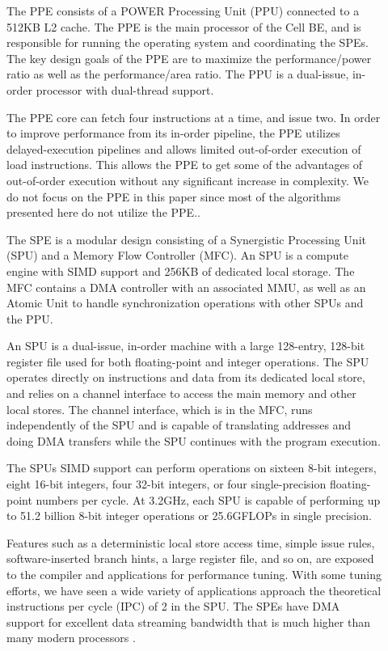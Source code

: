 \documentclass[DIV10, abstracton, openright, footsepline, headsepline, twoside, 9pt,
bigheadings]{scrreprt}
\begin{document}
\begin{description}
\item[\color{Bigblue}{PowerPC Processor Element (PPE)}]
The PPE consists of a POWER Processing Unit (PPU) connected to a 512KB L2 cache.
The PPE is the main processor of the Cell BE, and is responsible for running the
operating system and coordinating the SPEs. The key design goals of the PPE are
to maximize the performance/power ratio as well as the performance/area ratio.
The PPU is a dual-issue, in-order processor with dual-thread
support.

The PPE core can fetch four instructions at a time, and issue two. In order to
improve performance from its in-order pipeline, the PPE utilizes
delayed-execution pipelines and allows limited out-of-order execution of load
instructions. This allows the PPE to get some of the advantages of out-of-order
execution without any significant increase in complexity. We do not focus on the
PPE in this paper since most of the algorithms presented here do not utilize the
PPE.\cite{IBMhp05}.



\item[\color{Bigblue}{Synergistic Processor Elements (SPEs)}]
 The SPE is a modular design consisting of a Synergistic Processing Unit (SPU)
and a Memory Flow Controller (MFC). An SPU is a compute engine with SIMD support
and 256KB of dedicated local storage. The MFC contains a DMA controller with an
associated MMU, as well as an Atomic Unit to handle synchronization operations
with other SPUs and the PPU.

An SPU is a dual-issue, in-order machine with a large 128-entry, 128-bit
register file used for both floating-point and integer operations. The SPU
operates directly on instructions and data from its dedicated local store, and
relies on a channel interface to access the main memory and other local stores.
The channel interface, which is in the MFC, runs independently of the SPU and is
capable of translating addresses and doing DMA transfers while the SPU continues
with the program execution.

The SPUs SIMD support can perform operations on sixteen 8-bit integers, eight
16-bit integers, four 32-bit integers, or four single-precision floating-point
numbers per cycle. At 3.2GHz, each SPU is capable of performing up to 51.2
billion 8-bit integer operations or 25.6GFLOPs in single precision.

Features such as a deterministic local store access time, simple issue rules,
software-inserted branch hints, a large register file, and so on, are exposed to
the compiler and applications for performance tuning. With some tuning efforts,
we have seen a wide variety of applications approach the theoretical
instructions per cycle (IPC) of 2 in
the SPU. The SPEs have DMA support for excellent data streaming bandwidth that
is much higher than many modern processors \cite{IBMhp05}.


\end{description}
\end{document}

